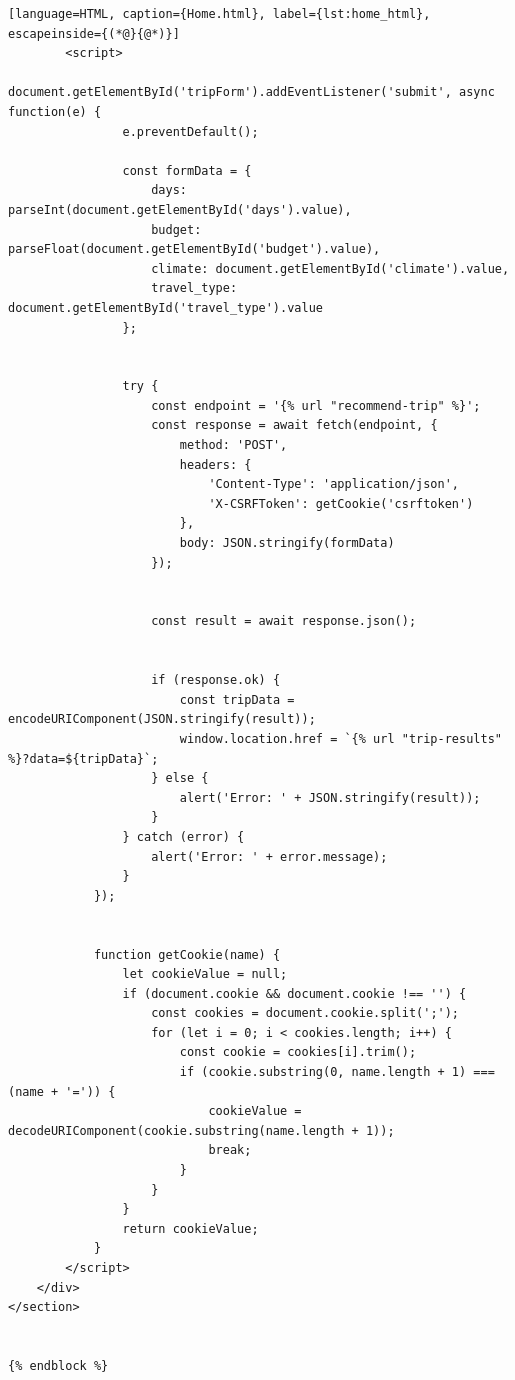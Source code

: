 \begin{lstlisting}[language=HTML, caption={Home.html}, label={lst:home_html}, escapeinside={(*@}{@*)}]
        <script>
            document.getElementById('tripForm').addEventListener('submit', async function(e) {
                e.preventDefault();
                
                const formData = {
                    days: parseInt(document.getElementById('days').value),
                    budget: parseFloat(document.getElementById('budget').value),
                    climate: document.getElementById('climate').value,
                    travel_type: document.getElementById('travel_type').value
                };


                try {
                    const endpoint = '{% url "recommend-trip" %}';
                    const response = await fetch(endpoint, {
                        method: 'POST',
                        headers: {
                            'Content-Type': 'application/json',
                            'X-CSRFToken': getCookie('csrftoken')
                        },
                        body: JSON.stringify(formData)
                    });


                    const result = await response.json();


                    if (response.ok) {
                        const tripData = encodeURIComponent(JSON.stringify(result));
                        window.location.href = `{% url "trip-results" %}?data=${tripData}`;
                    } else {
                        alert('Error: ' + JSON.stringify(result));
                    }
                } catch (error) {
                    alert('Error: ' + error.message);
                }
            });


            function getCookie(name) {
                let cookieValue = null;
                if (document.cookie && document.cookie !== '') {
                    const cookies = document.cookie.split(';');
                    for (let i = 0; i < cookies.length; i++) {
                        const cookie = cookies[i].trim();
                        if (cookie.substring(0, name.length + 1) === (name + '=')) {
                            cookieValue = decodeURIComponent(cookie.substring(name.length + 1));
                            break;
                        }
                    }
                }
                return cookieValue;
            }
        </script>
    </div>
</section>


{% endblock %}
\end{lstlisting}


